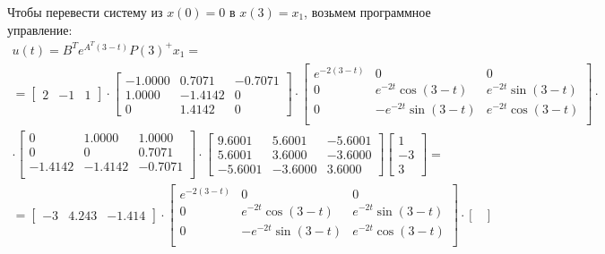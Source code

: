 Чтобы перевести систему из $x(0)=0$ в $x(3)=x_1$, возьмем программное управление:
\begin{multline*}
    u(t) = B^T e^{A^T(3 - t)} P(3)^+ x_1 = \\ =
    \begin{bmatrix}
        2 & -1 & 1
    \end{bmatrix}\cdot
    \begin{bmatrix}
        -1.0000&    0.7071 &  -0.7071\\
        1.0000  & -1.4142 &        0\\
             0   & 1.4142&         0
    \end{bmatrix}\cdot
    \begin{bmatrix}
        e^{-2(3-t)}&     0 &    0\\
        0  &  e^{-2t}\cos(3-t) &   e^{-2t}\sin(3-t)  \\
        0   &  -e^{-2t}\sin(3-t)&    e^{-2t}\cos(3-t) \\
    \end{bmatrix}\cdot\\
    \cdot\begin{bmatrix}
        0&    1.0000  &  1.0000\\
        0 &        0 &   0.7071\\
  -1.4142  & -1.4142&   -0.7071\\
    \end{bmatrix}\cdot
    \begin{bmatrix}
        9.6001&    5.6001  & -5.6001\\
        5.6001 &   3.6000 &  -3.6000\\
       -5.6001  & -3.6000&    3.6000
    \end{bmatrix}
    \begin{bmatrix}
        1 \\ -3 \\ 3
    \end{bmatrix}=\\
    =\begin{bmatrix}
        -3 & 4.243 & -1.414
    \end{bmatrix}\cdot
    \begin{bmatrix}
        e^{-2(3-t)}&     0 &    0\\
        0  &  e^{-2t}\cos(3-t) &   e^{-2t}\sin(3-t)  \\
        0   &  -e^{-2t}\sin(3-t)&    e^{-2t}\cos(3-t) \\
    \end{bmatrix}\cdot
    \begin{bmatrix}

\end{bmatrix}
\end{multline*}
